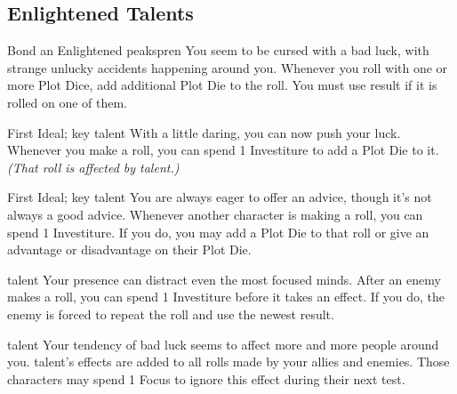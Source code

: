 \newpage
\subsection{Enlightened Talents}

		{Bond an Enlightened peakspren}
		{\iconConstant}
		{You seem to be cursed with a bad luck, with strange unlucky accidents happening around you.}
		{Whenever you roll with one or more Plot Dice, add additional Plot Die to the roll. You must use \iconComp{} result if it is rolled on one of them.}
		
\talent{\talentStonewardAddOwnPlotName}
		{First Ideal; \talentStonewardKeyName{} key talent}
		{\iconSpecial}
		{With a little daring, you can now push your luck.}
		{Whenever you make a roll, you can spend 1 Investiture to add a Plot Die to it. \textit{(That roll is affected by \talentStonewardKeyName{} talent.)}}
		
\talent{\talentStonewardAddOthersPlotName}
		{First Ideal; \talentStonewardKeyName{} key talent}
		{\iconSpecial}
		{You are always eager to offer an advice, though it's not always a good advice.}
		{Whenever another character is making a roll, you can spend 1 Investiture. If you do, you may add a Plot Die to that roll or give an advantage or disadvantage on their Plot Die.}
		
\talent{\talentStonewardSilveryBarbsName}
		{\talentStonewardAddOthersPlotName{} talent}
		{\iconReaction}
		{Your presence can distract even the most focused minds.}
		{After an enemy makes a roll, you can spend 1 Investiture before it takes an effect. If you do, the enemy is forced to repeat the roll and use the newest result.}
		
\talent{\talentStonewardDisadvantageOthersName}
		{\talentStonewardAddOthersPlotName{} talent}
		{\iconConstant}
		{Your tendency of bad luck seems to affect more and more people around you.}
		{\talentStonewardKeyName{} talent's effects are added to all rolls made by your allies and enemies. Those characters may spend 1 Focus to ignore this effect during their next test.}
		

